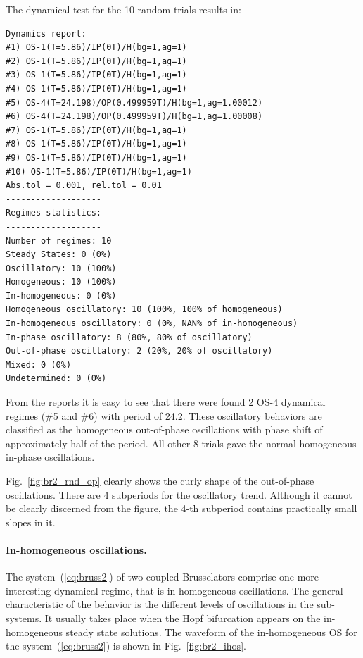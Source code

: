 \documentclass[11pt,a4paper]{article}
\begin{document}
The dynamical test for the 10 random trials results in:
\begin{verbatim}
Dynamics report:
#1) OS-1(T=5.86)/IP(0T)/H(bg=1,ag=1)
#2) OS-1(T=5.86)/IP(0T)/H(bg=1,ag=1)
#3) OS-1(T=5.86)/IP(0T)/H(bg=1,ag=1)
#4) OS-1(T=5.86)/IP(0T)/H(bg=1,ag=1)
#5) OS-4(T=24.198)/OP(0.499959T)/H(bg=1,ag=1.00012)
#6) OS-4(T=24.198)/OP(0.499959T)/H(bg=1,ag=1.00008)
#7) OS-1(T=5.86)/IP(0T)/H(bg=1,ag=1)
#8) OS-1(T=5.86)/IP(0T)/H(bg=1,ag=1)
#9) OS-1(T=5.86)/IP(0T)/H(bg=1,ag=1)
#10) OS-1(T=5.86)/IP(0T)/H(bg=1,ag=1)
Abs.tol = 0.001, rel.tol = 0.01
-------------------
Regimes statistics:
-------------------
Number of regimes: 10
Steady States: 0 (0%)
Oscillatory: 10 (100%)
Homogeneous: 10 (100%)
In-homogeneous: 0 (0%)
Homogeneous oscillatory: 10 (100%, 100% of homogeneous)
In-homogeneous oscillatory: 0 (0%, NAN% of in-homogeneous)
In-phase oscillatory: 8 (80%, 80% of oscillatory)
Out-of-phase oscillatory: 2 (20%, 20% of oscillatory)
Mixed: 0 (0%)
Undetermined: 0 (0%)
\end{verbatim}

From the reports it is easy to see that there were found 2 OS-4 dynamical regimes
(\#5 and \#6) with period of 24.2. These oscillatory behaviors are classified as the
homogeneous out-of-phase oscillations with phase shift of approximately half of the
period. All other 8 trials gave the normal homogeneous in-phase oscillations.

Fig.~\ref{fig:br2_rnd_op} clearly shows the curly shape of the out-of-phase
oscillations. There are 4 subperiods for the oscillatory trend. Although it cannot be
clearly discerned from the figure, the 4-th subperiod contains practically small
slopes in it.

\paragraph{In-homogeneous oscillations.}
\label{sec:homog-oscill}

The system~(\ref{eq:bruss2}) of two coupled Brusselators comprise one more
interesting dynamical regime, that is in-homogeneous oscillations. The general
characteristic of the behavior is the different levels of oscillations in the
sub-systems. It usually takes place when the Hopf bifurcation appears on the
in-homogeneous steady state solutions. The waveform of the in-homogeneous OS for the
system~(\ref{eq:bruss2}) is shown in Fig.~\ref{fig:br2_ihos}.
\end{document}
